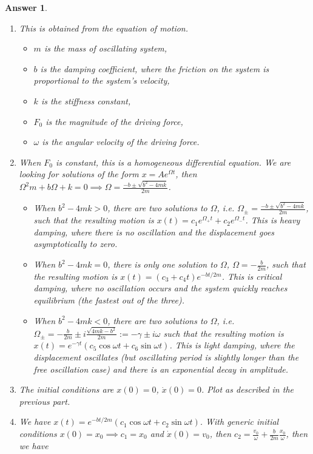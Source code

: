 \documentclass[a4paper]{article}
\newtheorem{ans}{Answer}[subsection]
\theoremstyle{new}
\begin{document}
\newpage
\begin{ans}\leavevmode
\begin{enumerate}[label=(\alph*)]
\item This is obtained from the equation of motion. 
\begin{itemize}
    \item $m$ is the mass of oscillating system,
    \item $b$ is the damping coefficient, where the friction on the system is proportional to the system's velocity,
    \item $k$ is the stiffness constant,
    \item $F_0$ is the magnitude of the driving force,
    \item $\omega$ is the angular velocity of the driving force.
\end{itemize}
\item When $F_0$ is constant, this is a homogeneous differential equation. We are looking for solutions of the form $x=Ae^{\Omega t}$, then $\Omega^2m+b\Omega+k=0\implies\Omega=\frac{-b\pm\sqrt{b^2-4mk}}{2m}$. 
\begin{itemize}
    \item When $b^2-4mk>0$, there are two solutions to $\Omega$, i.e. $\Omega_\pm=\frac{-b\pm\sqrt{b^2-4mk}}{2m}$, such that the resulting motion is $x(t)=c_1e^{\Omega_+t}+c_2e^{\Omega_-t}$. This is heavy damping, where there is no oscillation and the displacement goes asymptotically to zero. 
    \item When $b^2-4mk=0$, there is only one solution to $\Omega$, $\Omega=-\frac{b}{2m}$, such that the resulting motion is $x(t)=(c_3+c_4t)e^{-bt/2m}$. This is critical damping, where no oscillation occurs and the system quickly reaches equilibrium (the fastest out of the three). 
    \item When $b^2-4mk<0$, there are two solutions to $\Omega$, i.e. $\Omega_\pm=-\frac{b}{2m}\pm i\frac{\sqrt{4mk-b^2}}{2m}:=-\gamma\pm i\omega$ such that the resulting motion is $x(t)=e^{-\gamma t}(c_5\cos\omega t+c_6\sin\omega t)$. This is light damping, where the displacement oscillates (but oscillating period is slightly longer than the free oscillation case) and there is an exponential decay in amplitude.
\end{itemize}
\item The initial conditions are $x(0)=0$, $\dot{x}(0)=0$. Plot as described in the previous part.
\item We have $x(t)=e^{-bt/2m}(c_1\cos\omega t+c_2\sin\omega t)$. With generic initial conditions $x(0)=x_0\implies c_1=x_0$ and $\dot{x}(0)=v_0$, then $c_2=\frac{v_0}{\omega}+\frac{b}{2m}\frac{x_0}{\omega}$, then we have

\end{enumerate}
\end{ans}
\end{document}
